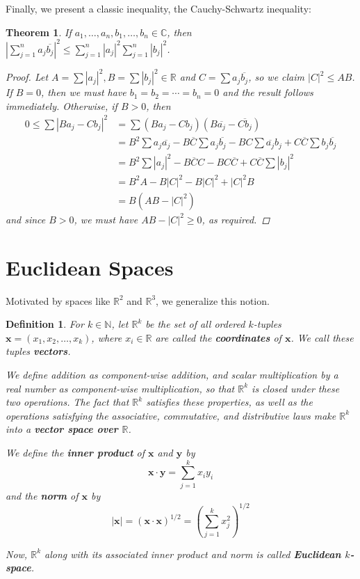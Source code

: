 \documentclass{scrbook}
\newcommand{\N}{\mathbb{N}}
\newcommand{\R}{\mathbb{R}}
\newcommand{\C}{\mathbb{C}}
\renewcommand{\bar}{\overline}
\newtheorem{theorem}{Theorem}
\newtheorem{definition}{Definition}
\begin{document}
Finally, we present a classic inequality, the Cauchy-Schwartz inequality:
\begin{theorem}
If $a_1, \dotsc, a_n, b_1, \dotsc, b_n \in \C$, then $\left| \sum_{j=1}^{n} a_j\bar{b_j} \right|^2 \le \sum_{j=1}^{n} |a_j|^2 \sum_{j=1}^{n} |b_j|^2$. 

\begin{proof}
Let $A = \sum |a_j|^2, B = \sum |b_j|^2 \in \R$ and $C = \sum a_j\bar{b_j}$, so we claim $|C|^2 \le AB$. If $B = 0$, then we must have $b_1 = b_2 = \dotsb = b_n = 0$ and the result follows immediately. Otherwise, if $B > 0$, then
\begin{align*}
0 \le \sum |B a_j - C b_j|^2 &= \sum (B a_j - C b_j)(B \bar{a_j} - \bar{C b_j}) \\
	&= B^2 \sum a_j \bar{a_j} - B\bar{C}\sum a_j \bar{b_j} - BC\sum \bar{a_j}b_j + C\bar{C} \sum b_j\bar{b_j} \\
	&= B^2 \sum|a_j|^2 - B\bar{C}C - BC\bar{C} + C\bar{C} \sum |b_j|^2 \\
	&= B^2 A - B|C|^2 - B|C|^2 + |C|^2 B \\
	&= B(AB - |C|^2)
\end{align*}
and since $B > 0$, we must have $AB - |C|^2 \ge 0$, as required. 
\end{proof}
\end{theorem}

\section{Euclidean Spaces}

Motivated by spaces like $\R^2$ and $\R^3$, we generalize this notion.
\begin{definition}
For $k \in \N$, let $\R^k$ be the set of all ordered $k$-tuples $\textbf{x} = (x_1, x_2, \dotsc, x_k)$, where $x_i \in \R$ are called the \textbf{coordinates} of $\textbf{x}$. We call these tuples \textbf{vectors}.

We define addition as component-wise addition, and scalar multiplication by a real number as component-wise multiplication, so that $\R^k$ is closed under these two operations. The fact that $\R^k$ satisfies these properties, as well as the operations satisfying the associative, commutative, and distributive laws make $\R^k$ into a \textbf{vector space over $\R$}.

We define the \textbf{inner product} of $\textbf{x}$ and $\textbf{y}$ by
\[
	\textbf{x} \cdot \textbf{y} = \sum_{j=1}^{k} x_i y_i
\]
and the \textbf{norm} of $\textbf{x}$ by
\[
	|\textbf{x}| = (\textbf{x} \cdot \textbf{x})^{1/2} = \left(\sum_{j=1}^{k} x_j^2 \right)^{1/2}
\]

Now, $\R^k$ along with its associated inner product and norm is called \textbf{Euclidean $k$-space}.
\end{definition}
\end{document}
